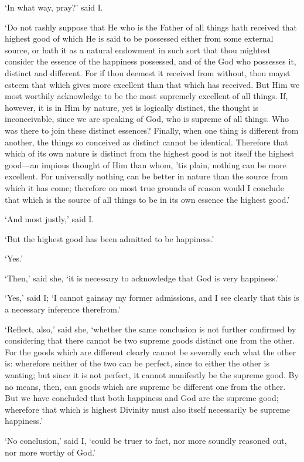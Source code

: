 \documentclass[12pt]{book}
\begin{document}
`In what way, pray?' said I.

`Do not rashly suppose that He who is the Father of all things hath
received that highest good of which He is said to be possessed either
from some external source, or hath it as a natural endowment in such
sort that thou mightest consider the essence of the happiness possessed,
and of the God who possesses it, distinct and different. For if thou
deemest it received from without, thou mayst esteem that which gives
more excellent than that which has received. But Him we most worthily
acknowledge to be the most supremely excellent of all things. If,
however, it is in Him by nature, yet is logically distinct, the thought
is inconceivable, since we are speaking of God, who is supreme of all
things. Who was there to join these distinct essences? Finally, when one
thing is different from another, the things so conceived as distinct
cannot be identical. Therefore that which of its own nature is distinct
from the highest good is not itself the highest good---an impious thought
of Him than whom, 'tis plain, nothing can be more excellent. For
universally nothing can be better in nature than the source from which
it has come; therefore on most true grounds of reason would I conclude
that which is the source of all things to be in its own essence the
highest good.'

`And most justly,' said I.

`But the highest good has been admitted to be happiness.'

`Yes.'

`Then,' said she, `it is necessary to acknowledge that God is very
happiness.'

`Yes,' said I; `I cannot gainsay my former admissions, and I see clearly
that this is a necessary inference therefrom.'

`Reflect, also,' said she, `whether the same conclusion is not further
confirmed by considering that there cannot be two supreme goods distinct
one from the other. For the goods which are different clearly cannot be
severally each what the other is: wherefore neither of the two can be
perfect, since to either the other is wanting; but since it is not
perfect, it cannot manifestly be the supreme good. By no means, then,
can goods which are supreme be different one from the other. But we have
concluded that both happiness and God are the supreme good; wherefore
that which is highest Divinity must also itself necessarily be supreme
happiness.'

`No conclusion,' said I, `could be truer to fact, nor more soundly
reasoned out, nor more worthy of God.'
\end{document}
